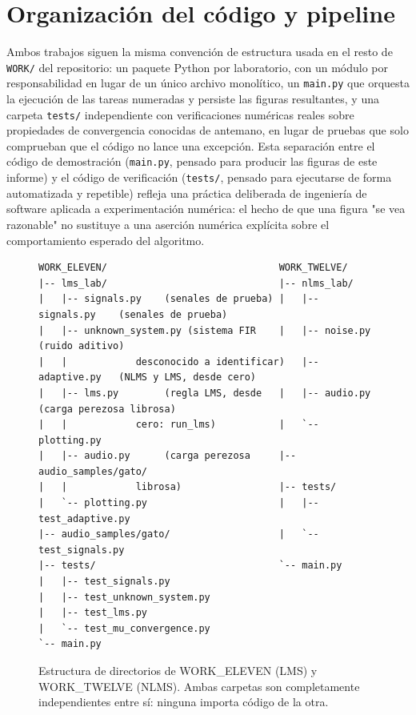 \section{Organización del código y pipeline}
\label{sec:codebase}

Ambos trabajos siguen la misma convención de estructura usada en el
resto de \texttt{WORK/} del repositorio: un paquete Python por
laboratorio, con un módulo por responsabilidad en lugar de un único
archivo monolítico, un \texttt{main.py} que orquesta la ejecución de
las tareas numeradas y persiste las figuras resultantes, y una carpeta
\texttt{tests/} independiente con verificaciones numéricas reales
sobre propiedades de convergencia conocidas de antemano, en lugar de
pruebas que solo comprueban que el código no lance una excepción. Esta
separación entre el código de demostración (\texttt{main.py}, pensado
para producir las figuras de este informe) y el código de
verificación (\texttt{tests/}, pensado para ejecutarse de forma
automatizada y repetible) refleja una práctica deliberada de
ingeniería de software aplicada a experimentación numérica: el hecho
de que una figura "se vea razonable" no sustituye a una aserción
numérica explícita sobre el comportamiento esperado del algoritmo.

\begin{figure}[!t]
\centering
\begin{verbatim}
WORK_ELEVEN/                              WORK_TWELVE/
|-- lms_lab/                              |-- nlms_lab/
|   |-- signals.py    (senales de prueba) |   |-- signals.py    (senales de prueba)
|   |-- unknown_system.py (sistema FIR    |   |-- noise.py      (ruido aditivo)
|   |            desconocido a identificar)   |-- adaptive.py   (NLMS y LMS, desde cero)
|   |-- lms.py        (regla LMS, desde   |   |-- audio.py      (carga perezosa librosa)
|   |            cero: run_lms)           |   `-- plotting.py
|   |-- audio.py      (carga perezosa     |-- audio_samples/gato/
|   |            librosa)                 |-- tests/
|   `-- plotting.py                       |   |-- test_adaptive.py
|-- audio_samples/gato/                   |   `-- test_signals.py
|-- tests/                                `-- main.py
|   |-- test_signals.py
|   |-- test_unknown_system.py
|   |-- test_lms.py
|   `-- test_mu_convergence.py
`-- main.py
\end{verbatim}
\caption{Estructura de directorios de WORK\_ELEVEN (LMS) y WORK\_TWELVE (NLMS). Ambas carpetas son completamente independientes entre sí: ninguna importa código de la otra.}
\label{fig:codebase_tree}
\end{figure}

